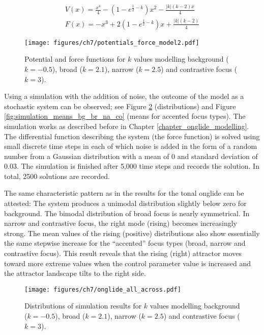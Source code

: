 \begin{equation}
\begin{split}
V(x) = \frac{x^4}{4} - (1-e^{\frac{1}{2}-k})x^2 - \frac{|k|(k-2)x}{4} \\
F(x) = - x^3 + 2(1-e^{\frac{1}{2}-k})x + \frac{|k|(k-2)}{4}
\label{eq:onglide_model2}
\end{split}
\end{equation}

\begin{figure}
\texttt{[image: figures/ch7/potentials\_force\_model2.pdf]}
\caption{Potential and force functions for $k$ values modelling background ($k=-0.5$), broad ($k=2.1$), narrow ($k=2.5$) and contrastive focus ($k=3$).}
\label{fig:potentials_force_bg_br_na_co}
\end{figure}

Using a simulation with the addition of noise, the outcome of the model as a stochastic system can be observed; see Figure \ref{fig:simulation_bg_br_na_co} (distributions) and Figure \ref{fig:simulation_means_bg_br_na_co} (means for accented focus types). The simulation works as described before in Chapter \ref{chapter_onglide_modelling}. The differential function describing the system (the force function) is solved using small discrete time steps in each of which noise is added in the form of a random number from a Gaussian distribution with a mean of $0$ and standard deviation of $0.03$. The simulation is finished after 5,000 time steps and records the solution. In total, 2500 solutions are recorded.

The same characteristic pattern as in the results for the tonal onglide can be attested: The system produces a unimodal distribution slightly below zero for background. The bimodal distribution of broad focus is nearly symmetrical. In narrow and contrastive focus, the right mode (rising) becomes increasingly strong. The mean values of the rising (positive) distributions also show essentially the same stepwise increase for the “accented” focus types (broad, narrow and contrastive focus). This result reveals that the rising (right) attractor moves toward more extreme values when the control parameter value is increased and the attractor landscape tilts to the right side.

\begin{figure}[t]
\texttt{[image: figures/ch7/onglide\_all\_across.pdf]}
\caption{Distributions of simulation results for $k$ values modelling background ($k=-0.5$), broad ($k=2.1$), narrow ($k=2.5$) and contrastive focus ($k=3$).}
\label{fig:simulation_bg_br_na_co}
\end{figure}

